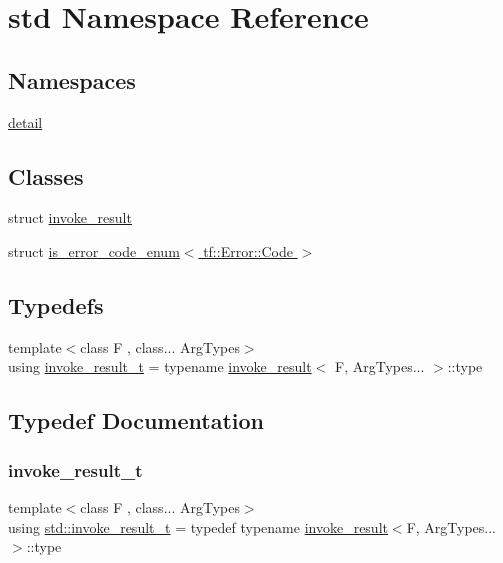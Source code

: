 \hypertarget{namespacestd}{}\section{std Namespace Reference}
\label{namespacestd}
\subsection*{Namespaces}
\begin{DoxyCompactItemize}
\item 
 \hyperlink{namespacestd_1_1detail}{detail}
\end{DoxyCompactItemize}
\subsection*{Classes}
\begin{DoxyCompactItemize}
\item 
struct \hyperlink{structstd_1_1invoke__result}{invoke\+\_\+result}
\item 
struct \hyperlink{structstd_1_1is__error__code__enum_3_01tf_1_1Error_1_1Code_01_4}{is\+\_\+error\+\_\+code\+\_\+enum$<$ tf\+::\+Error\+::\+Code $>$}
\end{DoxyCompactItemize}
\subsection*{Typedefs}
\begin{DoxyCompactItemize}
\item 
{\footnotesize template$<$class F , class... Arg\+Types$>$ }\\using \hyperlink{namespacestd_a492e7f3c5595a8b7a7c6e0c9294f5c81}{invoke\+\_\+result\+\_\+t} = typename \hyperlink{structstd_1_1invoke__result}{invoke\+\_\+result}$<$ F, Arg\+Types... $>$\+::type
\end{DoxyCompactItemize}


\subsection{Typedef Documentation}
\mbox{\label{namespacestd_a492e7f3c5595a8b7a7c6e0c9294f5c81}} 
\subsubsection{\texorpdfstring{invoke\+\_\+result\+\_\+t}{invoke\_result\_t}}
{\footnotesize\ttfamily template$<$class F , class... Arg\+Types$>$ \\
using \hyperlink{namespacestd_a492e7f3c5595a8b7a7c6e0c9294f5c81}{std\+::invoke\+\_\+result\+\_\+t} = typedef typename \hyperlink{structstd_1_1invoke__result}{invoke\+\_\+result}$<$F, Arg\+Types...$>$\+::type}

